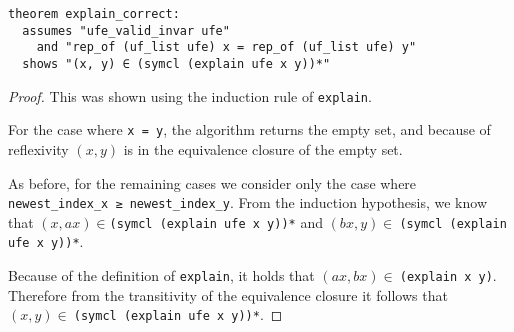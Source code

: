 \begin{lstlisting}
theorem explain_correct:
  assumes "ufe_valid_invar ufe"
    and "rep_of (uf_list ufe) x = rep_of (uf_list ufe) y"
  shows "(x, y) ∈ (symcl (explain ufe x y))*"
\end{lstlisting}

\begin{proof}
This was shown using the induction rule of \lstinline|explain|.

For the case where \lstinline|x = y|, the algorithm returns the empty set, and because of reflexivity $(x, y)$ is in the equivalence closure of the empty set.

As before, for the remaining cases we consider only the case where \lstinline|newest_index_x ≥ newest_index_y|.
From the induction hypothesis, we know that $(x, ax) \in$\lstinline{(symcl (explain ufe x y))*} and $(bx, y) \in\:$\lstinline{(symcl (explain ufe x y))*}.

Because of the definition of \lstinline|explain|, it holds that $(ax, bx) \in\:$\lstinline{(explain x y)}. Therefore from the transitivity of the equivalence closure it follows that $(x, y) \in\:$\lstinline{(symcl (explain ufe x y))*}.
\end{proof}
